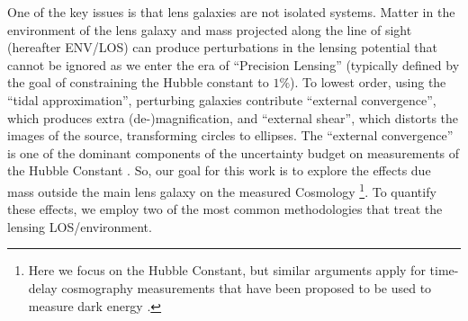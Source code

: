 One of the key issues is that lens galaxies are not isolated systems. Matter in the environment of the lens galaxy and mass projected along the line of sight (hereafter ENV/LOS) can produce perturbations in the lensing potential that cannot be ignored as we enter the era of ``Precision Lensing'' (typically defined by the goal of constraining the Hubble constant to $1\%$). To lowest order, using the ``tidal approximation'', perturbing galaxies contribute ``external convergence'', which produces extra (de-)magnification, and ``external shear'', which distorts the images of the source, transforming circles to ellipses. The ``external convergence'' is one of the dominant components of the uncertainty budget on measurements of the Hubble Constant \citep{Suyu12}. So, our goal for this work is to explore the effects due mass outside the main lens galaxy on the measured Cosmology \footnote{Here we focus on the Hubble Constant, but similar arguments apply for time-delay cosmography measurements that have been proposed to be used to measure dark energy \citep{Treu13}.}. To quantify these effects, we employ two of the most common methodologies that treat the lensing LOS/environment.

